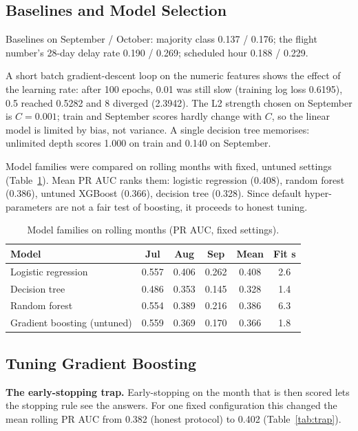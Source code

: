 \documentclass[conference]{IEEEtran}
\begin{document}
\subsection{Baselines and Model Selection}
Baselines on September / October: majority class 0.137 / 0.176; the flight number's 28-day delay rate 0.190 / 0.269; scheduled hour 0.188 / 0.229.

A short batch gradient-descent loop on the numeric features shows the effect of the learning rate: after 100 epochs, 0.01 was still slow (training log loss 0.6195), 0.5 reached 0.5282 and 8 diverged (2.3942). The L2 strength chosen on September is $C=0.001$; train and September scores hardly change with $C$, so the linear model is limited by bias, not variance. A single decision tree memorises: unlimited depth scores 1.000 on train and 0.140 on September.

Model families were compared on rolling months with fixed, untuned settings (Table~\ref{tab:family}). Mean PR AUC ranks them: logistic regression (0.408), random forest (0.386), untuned XGBoost (0.366), decision tree (0.328). Since default hyper-parameters are not a fair test of boosting, it proceeds to honest tuning.

\begin{table}[t]\centering\caption{Model families on rolling months (PR AUC, fixed settings).}\label{tab:family}
\setlength{\tabcolsep}{3pt}\footnotesize\begin{tabular}{lccccc}\toprule
Model & Jul & Aug & Sep & Mean & Fit s\\\midrule
Logistic regression & 0.557 & 0.406 & 0.262 & 0.408 & 2.6\\
Decision tree & 0.486 & 0.353 & 0.145 & 0.328 & 1.4\\
Random forest & 0.554 & 0.389 & 0.216 & 0.386 & 6.3\\
Gradient boosting (untuned) & 0.559 & 0.369 & 0.170 & 0.366 & 1.8\\
\bottomrule\end{tabular}\end{table}

\subsection{Tuning Gradient Boosting}
\textbf{The early-stopping trap.} Early-stopping on the month that is then scored lets the stopping rule see the answers. For one fixed configuration this changed the mean rolling PR AUC from 0.382 (honest protocol) to 0.402 (Table~\ref{tab:trap}).
\end{document}
